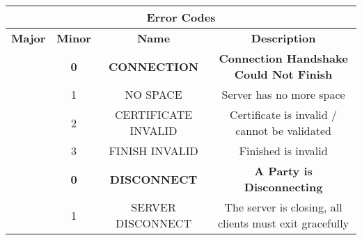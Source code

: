 \begin{table}[H]
    \centering
    \begin{tabular}{|ccclcllll|}
    \hline
    \multicolumn{9}{|c|}{\textbf{Error   Codes}} \\ \hline
    \multicolumn{1}{|c|}{\textbf{Major}} &
      \multicolumn{1}{c|}{\textbf{Minor}} &
      \multicolumn{2}{c|}{\textbf{Name}} &
      \multicolumn{5}{c|}{\textbf{Description}} \\ \hline
    \rowcolor[HTML]{DEFEDF} 
    \multicolumn{1}{|c|}{\cellcolor[HTML]{FFF8DD}} &
      \multicolumn{1}{c|}{\cellcolor[HTML]{DEFEDF}\textbf{0}} &
      \multicolumn{2}{c|}{\cellcolor[HTML]{DEFEDF}\textbf{CONNECTION}} &
      \multicolumn{5}{c|}{\cellcolor[HTML]{DEFEDF}\textbf{Connection Handshake Could   Not Finish}} \\ \cline{2-9} 
    \rowcolor[HTML]{FFF8DD} 
    \multicolumn{1}{|c|}{\cellcolor[HTML]{FFF8DD}} &
      \multicolumn{1}{c|}{\cellcolor[HTML]{FFF8DD}1} &
      \multicolumn{2}{c|}{\cellcolor[HTML]{FFF8DD}NO SPACE} &
      \multicolumn{5}{c|}{\cellcolor[HTML]{FFF8DD}Server has no more space} \\ \cline{2-9} 
    \rowcolor[HTML]{FFDDDD} 
    \multicolumn{1}{|c|}{\cellcolor[HTML]{FFF8DD}} &
      \multicolumn{1}{c|}{\cellcolor[HTML]{FFDDDD}2} &
      \multicolumn{2}{c|}{\cellcolor[HTML]{FFDDDD}CERTIFICATE INVALID} &
      \multicolumn{5}{c|}{\cellcolor[HTML]{FFDDDD}Certificate is invalid /   cannot be validated} \\ \cline{2-9} 
    \rowcolor[HTML]{FFF8DD} 
    \multicolumn{1}{|c|}{\multirow{-4}{*}{\cellcolor[HTML]{FFF8DD}\textbf{1}}} &
      \multicolumn{1}{c|}{\cellcolor[HTML]{FFF8DD}3} &
      \multicolumn{2}{c|}{\cellcolor[HTML]{FFF8DD}FINISH INVALID} &
      \multicolumn{5}{c|}{\cellcolor[HTML]{FFF8DD}Finished is invalid} \\ \hline
    \rowcolor[HTML]{DEFEDF} 
    \multicolumn{1}{|c|}{\cellcolor[HTML]{FFDDDD}} &
      \multicolumn{1}{c|}{\cellcolor[HTML]{DEFEDF}\textbf{0}} &
      \multicolumn{2}{c|}{\cellcolor[HTML]{DEFEDF}\textbf{DISCONNECT}} &
      \multicolumn{5}{c|}{\cellcolor[HTML]{DEFEDF}\textbf{A Party is Disconnecting}} \\ \cline{2-9} 
    \rowcolor[HTML]{FFF8DD} 
    \multicolumn{1}{|c|}{\cellcolor[HTML]{FFDDDD}} &
      \multicolumn{1}{c|}{\cellcolor[HTML]{FFF8DD}1} &
      \multicolumn{2}{c|}{\cellcolor[HTML]{FFF8DD}SERVER DISCONNECT} &
      \multicolumn{5}{c|}{\cellcolor[HTML]{FFF8DD}The server is closing, all   clients must exit gracefully} \\ \cline{2-9} 

\end{tabular}
\end{table}

